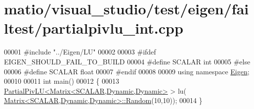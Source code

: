 \hypertarget{matio_2visual__studio_2test_2eigen_2failtest_2partialpivlu__int_8cpp_source}{}\section{matio/visual\+\_\+studio/test/eigen/failtest/partialpivlu\+\_\+int.cpp}
\label{matio_2visual__studio_2test_2eigen_2failtest_2partialpivlu__int_8cpp_source}

\begin{DoxyCode}
00001 \textcolor{preprocessor}{#include "../Eigen/LU"}
00002 
00003 \textcolor{preprocessor}{#ifdef EIGEN\_SHOULD\_FAIL\_TO\_BUILD}
00004 \textcolor{preprocessor}{#define SCALAR int}
00005 \textcolor{preprocessor}{#else}
00006 \textcolor{preprocessor}{#define SCALAR float}
00007 \textcolor{preprocessor}{#endif}
00008 
00009 \textcolor{keyword}{using namespace }\hyperlink{namespace_eigen}{Eigen};
00010 
00011 \textcolor{keywordtype}{int} main()
00012 \{
00013   \hyperlink{group___l_u___module_class_eigen_1_1_partial_piv_l_u}{PartialPivLU<Matrix<SCALAR,Dynamic,Dynamic>} > lu(
      \hyperlink{group___core___module_class_eigen_1_1_matrix}{Matrix<SCALAR,Dynamic,Dynamic>::Random}(10,10));
00014 \}
\end{DoxyCode}
